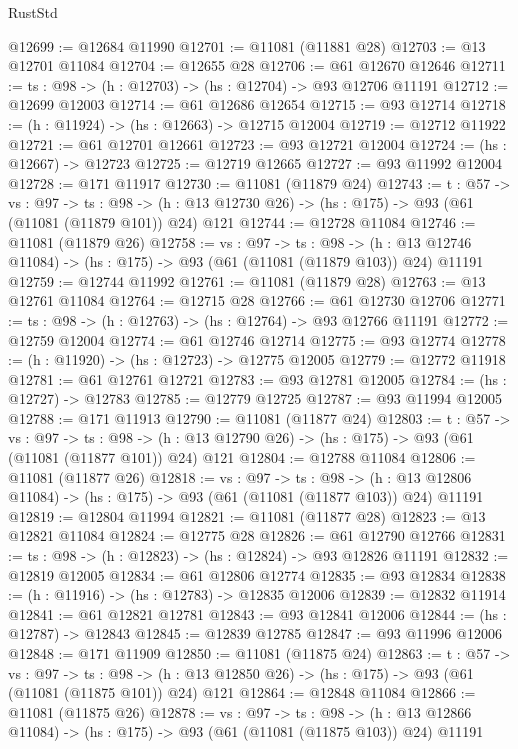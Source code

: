 \begin{lexlean}{RustStd}
\begin{coremodule}
@12699 := @12684 @11990
@12701 := @11081 (@11881 @28)
@12703 := @13 @12701 @11084
@12704 := @12655 @28
@12706 := @61 @12670 @12646
@12711 := {ts : @98} -> (h : @12703) -> (hs : @12704) -> @93 @12706 @11191
@12712 := @12699 @12003
@12714 := @61 @12686 @12654
@12715 := @93 @12714
@12718 := (h : @11924) -> (hs : @12663) -> @12715 @12004
@12719 := @12712 @11922
@12721 := @61 @12701 @12661
@12723 := @93 @12721 @12004
@12724 := (hs : @12667) -> @12723
@12725 := @12719 @12665
@12727 := @93 @11992 @12004
@12728 := @171 @11917
@12730 := @11081 (@11879 @24)
@12743 := {t : @57} ->
  {vs : @97} ->
  {ts : @98} -> (h : @13 @12730 @26) -> (hs : @175) -> @93 (@61 (@11081 (@11879 @101)) @24) @121
@12744 := @12728 @11084
@12746 := @11081 (@11879 @26)
@12758 := {vs : @97} ->
  {ts : @98} ->
  (h : @13 @12746 @11084) -> (hs : @175) -> @93 (@61 (@11081 (@11879 @103)) @24) @11191
@12759 := @12744 @11992
@12761 := @11081 (@11879 @28)
@12763 := @13 @12761 @11084
@12764 := @12715 @28
@12766 := @61 @12730 @12706
@12771 := {ts : @98} -> (h : @12763) -> (hs : @12764) -> @93 @12766 @11191
@12772 := @12759 @12004
@12774 := @61 @12746 @12714
@12775 := @93 @12774
@12778 := (h : @11920) -> (hs : @12723) -> @12775 @12005
@12779 := @12772 @11918
@12781 := @61 @12761 @12721
@12783 := @93 @12781 @12005
@12784 := (hs : @12727) -> @12783
@12785 := @12779 @12725
@12787 := @93 @11994 @12005
@12788 := @171 @11913
@12790 := @11081 (@11877 @24)
@12803 := {t : @57} ->
  {vs : @97} ->
  {ts : @98} -> (h : @13 @12790 @26) -> (hs : @175) -> @93 (@61 (@11081 (@11877 @101)) @24) @121
@12804 := @12788 @11084
@12806 := @11081 (@11877 @26)
@12818 := {vs : @97} ->
  {ts : @98} ->
  (h : @13 @12806 @11084) -> (hs : @175) -> @93 (@61 (@11081 (@11877 @103)) @24) @11191
@12819 := @12804 @11994
@12821 := @11081 (@11877 @28)
@12823 := @13 @12821 @11084
@12824 := @12775 @28
@12826 := @61 @12790 @12766
@12831 := {ts : @98} -> (h : @12823) -> (hs : @12824) -> @93 @12826 @11191
@12832 := @12819 @12005
@12834 := @61 @12806 @12774
@12835 := @93 @12834
@12838 := (h : @11916) -> (hs : @12783) -> @12835 @12006
@12839 := @12832 @11914
@12841 := @61 @12821 @12781
@12843 := @93 @12841 @12006
@12844 := (hs : @12787) -> @12843
@12845 := @12839 @12785
@12847 := @93 @11996 @12006
@12848 := @171 @11909
@12850 := @11081 (@11875 @24)
@12863 := {t : @57} ->
  {vs : @97} ->
  {ts : @98} -> (h : @13 @12850 @26) -> (hs : @175) -> @93 (@61 (@11081 (@11875 @101)) @24) @121
@12864 := @12848 @11084
@12866 := @11081 (@11875 @26)
@12878 := {vs : @97} ->
  {ts : @98} ->
  (h : @13 @12866 @11084) -> (hs : @175) -> @93 (@61 (@11081 (@11875 @103)) @24) @11191

\end{coremodule}
\end{lexlean}
